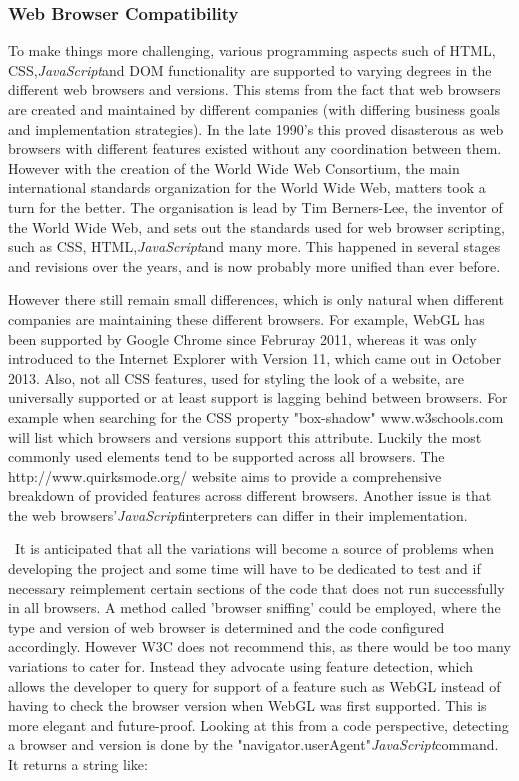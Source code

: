 \documentclass[a4paper,11pt,twoside]{article}
\begin{document}
\subsubsection{Web Browser Compatibility}

To make things more challenging, various programming aspects such of HTML, CSS,\textit{JavaScript}and DOM functionality are supported to varying degrees in the different web browsers and versions. This stems from the fact that web browsers are created and maintained by different companies (with differing business goals and implementation strategies). In the late 1990's this proved disasterous as web browsers with different features existed without any coordination between them. However with the creation of the World Wide Web Consortium, the main international standards organization for the World Wide Web, matters took a turn for the better. The organisation is lead by Tim Berners-Lee, the inventor of the World Wide Web, and sets out the standards used for web browser scripting, such as CSS, HTML,\textit{JavaScript}and many more. This happened in several stages and revisions over the years, and is now probably more unified than ever before. 

However there still remain small differences, which is only natural when different companies are maintaining these different browsers. For example, WebGL has been supported by Google Chrome since Februray 2011, whereas it was only introduced to the Internet Explorer with Version 11, which came out in October 2013. Also, not all CSS features, used for styling the look of a website, are universally supported or at least support is lagging behind between browsers. For example when searching for the CSS property "box-shadow" www.w3schools.com will list which browsers and versions support this attribute. Luckily the most commonly used elements tend to be supported across all browsers. The http://www.quirksmode.org/ website aims to provide a comprehensive breakdown of provided features across different browsers. Another issue is that the web browsers'\textit{JavaScript}interpreters can differ in their implementation.

\
It is anticipated that all the variations will become a source of problems when developing the project and some time will have to be dedicated to test and if necessary reimplement certain sections of the code that does not run successfully in all browsers. A method called 'browser sniffing' could be employed, where the type and version of web browser is determined and the code configured accordingly. However W3C does not recommend this, as there would be too many variations to cater for. Instead they advocate using feature detection, which allows the developer to query for support of a feature such as WebGL instead of having to check the browser version when WebGL was first supported. This is more elegant and future-proof. 
Looking at this from a code perspective, detecting a browser and version is done by the "navigator.userAgent"\textit{JavaScript}command. It returns a string like:
\end{document}
